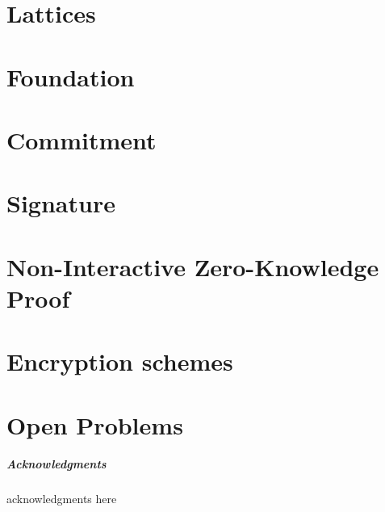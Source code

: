 \documentclass[runningheads,orivec]{llncs}
\date{\today}					%
\def\acknowledgmenttext{
	acknowledgments here
}
\begin{document}


\chapter{Lattices}

\chapter{Foundation}

\chapter{Commitment}

\chapter{Signature}

\chapter{Non-Interactive Zero-Knowledge Proof}


\chapter{Encryption schemes}

\chapter{Open Problems}





\checkfornotes
\ifnum{}
	\ifnum{}
		\paragraph{Acknowledgments}
		\acknowledgmenttext
	\fi
\fi
\ifnum{}
	
\else
	
\fi
\appendix
\end{document}
